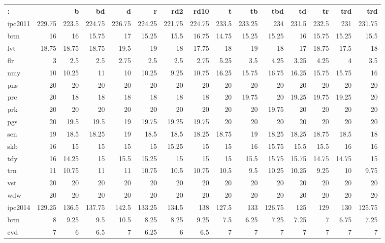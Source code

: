 \begin{center}
\begin{tabular}{lrrrrrrrrrrrrrr}
: &  & b & bd & d & r & rd2 & rd10 & t & tb & tbd & td & tr & trd & trd\\
\hline
ipc2011 & 229.75 & 223.5 & 224.75 & 226.75 & 224.25 & 221.75 & 224.75 & 233.5 & 233.25 & 234 & 231.5 & 232.5 & 231 & 231.75\\
\hline
brm & 16 & 16 & 15.75 & 17 & 15.25 & 15.5 & 16.75 & 14.75 & 15.25 & 15.25 & 16 & 15.75 & 15.25 & 15.5\\
lvt & 18.75 & 18.75 & 18.75 & 19.5 & 19 & 18 & 17.75 & 18 & 19 & 18 & 17 & 18.75 & 17.5 & 18\\
flr & 3 & 2.5 & 2.5 & 2.75 & 2.5 & 2.5 & 2.75 & 5.25 & 3.5 & 4.25 & 3.25 & 4.25 & 4 & 3.5\\
nmy & 10 & 10.25 & 11 & 10 & 10.25 & 9.25 & 10.75 & 16.25 & 15.75 & 16.75 & 16.25 & 15.75 & 15.75 & 16\\
pns & 20 & 20 & 20 & 20 & 20 & 20 & 20 & 20 & 20 & 20 & 20 & 20 & 20 & 20\\
prc & 20 & 18 & 18 & 18 & 18 & 18 & 18 & 20 & 19.75 & 20 & 19.25 & 19.75 & 19.25 & 20\\
prk & 20 & 20 & 20 & 20 & 20 & 20 & 20 & 20 & 20 & 19.75 & 20 & 20 & 20 & 20\\
pgs & 20 & 19.5 & 19.5 & 19 & 19.75 & 19.25 & 19.75 & 20 & 20 & 20 & 20 & 20 & 20 & 20\\
scn & 19 & 18.5 & 18.25 & 19 & 18.5 & 18.5 & 18.25 & 18.75 & 19 & 18.25 & 18.25 & 18.75 & 18.5 & 18\\
skb & 16 & 15 & 15 & 15 & 15 & 15.25 & 15 & 15 & 16 & 15.75 & 15.5 & 15.5 & 16 & 16\\
tdy & 16 & 14.25 & 15 & 15.5 & 15.25 & 15 & 15 & 15 & 15.5 & 15.75 & 15.75 & 14.75 & 14.75 & 15\\
trn & 11 & 10.75 & 11 & 11 & 10.75 & 10.5 & 10.75 & 10.5 & 9.5 & 10.25 & 10.25 & 9.25 & 10 & 9.75\\
vst & 20 & 20 & 20 & 20 & 20 & 20 & 20 & 20 & 20 & 20 & 20 & 20 & 20 & 20\\
wdw & 20 & 20 & 20 & 20 & 20 & 20 & 20 & 20 & 20 & 20 & 20 & 20 & 20 & 20\\
\hline
ipc2014 & 129.25 & 136.5 & 137.75 & 142.5 & 133.25 & 134.5 & 138 & 127.5 & 133 & 126.75 & 125 & 129 & 130 & 125.75\\
\hline
brm & 8 & 9.25 & 9.5 & 10.5 & 8.25 & 8.25 & 9.25 & 7.5 & 6.25 & 7.25 & 7.25 & 7 & 6.75 & 7.25\\
cvd & 7 & 6 & 6.5 & 7 & 6.25 & 6 & 6.5 & 7 & 7 & 7 & 7 & 7 & 7 & 7\\

\end{tabular}
\end{center}
